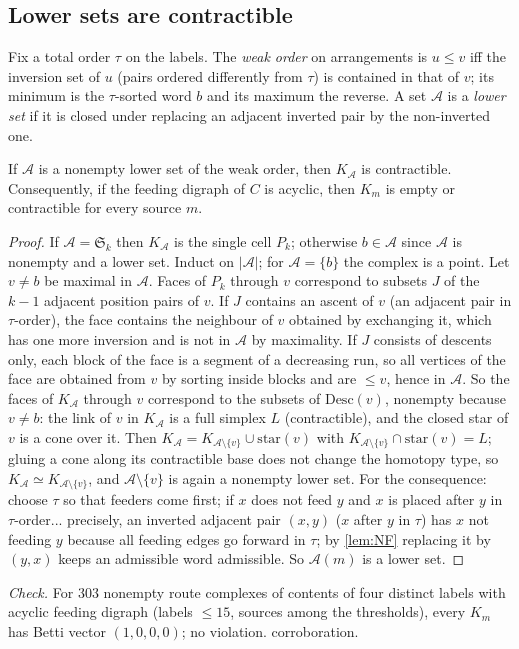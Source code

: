 \subsection{Lower sets are contractible}
Fix a total order $\tau$ on the labels. The \emph{weak order} on arrangements is $u\le v$ iff the inversion set of $u$ (pairs ordered differently from $\tau$) is contained in that of $v$; its minimum is the $\tau$-sorted word $b$ and its maximum the reverse. A set $\mathcal A$ is a \emph{lower set} if it is closed under replacing an adjacent inverted pair by the non-inverted one.
\begin{theorem}\label{thm:lower}
If $\mathcal A$ is a nonempty lower set of the weak order, then $K_{\mathcal A}$ is contractible. Consequently, if the feeding digraph of $C$ is acyclic, then $K_m$ is empty or contractible for every source $m$.
\end{theorem}
\begin{proof}
If $\mathcal A=\mathfrak S_k$ then $K_{\mathcal A}$ is the single cell $P_k$; otherwise $b\in\mathcal A$ since $\mathcal A$ is nonempty and a lower set. Induct on $|\mathcal A|$; for $\mathcal A=\{b\}$ the complex is a point. Let $v\ne b$ be maximal in $\mathcal A$. Faces of $P_k$ through $v$ correspond to subsets $J$ of the $k-1$ adjacent position pairs of $v$. If $J$ contains an ascent of $v$ (an adjacent pair in $\tau$-order), the face contains the neighbour of $v$ obtained by exchanging it, which has one more inversion and is not in $\mathcal A$ by maximality. If $J$ consists of descents only, each block of the face is a segment of a decreasing run, so all vertices of the face are obtained from $v$ by sorting inside blocks and are $\le v$, hence in $\mathcal A$. So the faces of $K_{\mathcal A}$ through $v$ correspond to the subsets of $\mathrm{Desc}(v)$, nonempty because $v\ne b$: the link of $v$ in $K_{\mathcal A}$ is a full simplex $L$ (contractible), and the closed star of $v$ is a cone over it. Then $K_{\mathcal A}=K_{\mathcal A\setminus\{v\}}\cup\mathrm{star}(v)$ with $K_{\mathcal A\setminus\{v\}}\cap\mathrm{star}(v)=L$; gluing a cone along its contractible base does not change the homotopy type, so $K_{\mathcal A}\simeq K_{\mathcal A\setminus\{v\}}$, and $\mathcal A\setminus\{v\}$ is again a nonempty lower set. For the consequence: choose $\tau$ so that feeders come first; if $x$ does not feed $y$ and $x$ is placed after $y$ in $\tau$-order... precisely, an inverted adjacent pair $(x,y)$ ($x$ after $y$ in $\tau$) has $x$ not feeding $y$ because all feeding edges go forward in $\tau$; by \cref{lem:NF} replacing it by $(y,x)$ keeps an admissible word admissible. So $\mathcal A(m)$ is a lower set.
\end{proof}
\emph{Check.} For $303$ nonempty route complexes of contents of four distinct labels with acyclic feeding digraph (labels $\le15$, sources among the thresholds), every $K_m$ has Betti vector $(1,0,0,0)$; no violation.  corroboration.

